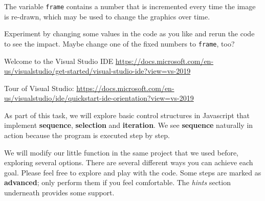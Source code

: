 \begin{steps}
  The variable \texttt{frame} contains a number that is incremented every time the image is re-drawn, which may be used to change the graphics over time.
  \item Experiment by changing some values in the code as you like and rerun the code to see the impact.
  Maybe change one of the fixed numbers to \texttt{frame}, too?
\end{steps}

\begin{literature}
\item Welcome to the Visual Studio IDE
\url{https://docs.microsoft.com/en-us/visualstudio/get-started/visual-studio-ide?view=vs-2019}
\item Tour of Visual Studio: \url{https://docs.microsoft.com/en-us/visualstudio/ide/quickstart-ide-orientation?view=vs-2019}
\end{literature}




As part of this task, we will explore basic control structures in Javascript that implement \textbf{sequence}, \textbf{selection} and \textbf{iteration}.
We see \textbf{sequence} naturally in action because the program is executed step by step.

We will modify our little  function in the same project that we used before, exploring several options.
There are several different ways you can achieve each goal. Please feel free to explore and play with the code.
Some steps are marked as \textbf{advanced}; only perform them if you feel comfortable.
The \textit{hints} section underneath provides some support.

